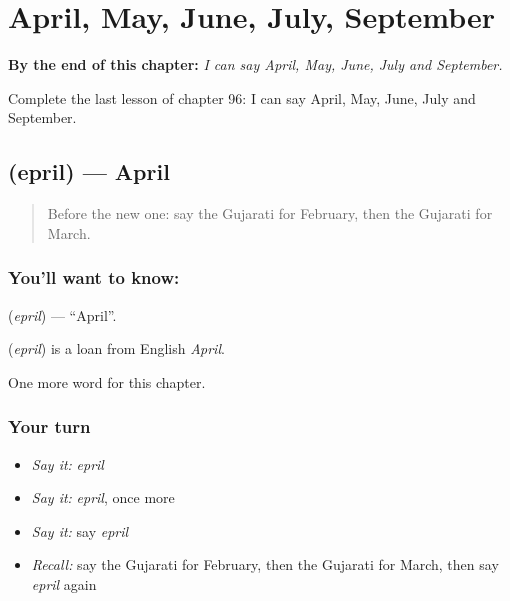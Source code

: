 
\chapter{April, May, June, July, September}
\label{ch:gu-april-may-june-july-september}

\begin{chapteropening}
\textbf{By the end of this chapter:} \emph{I can say April, May, June, July and September.}

Complete the last lesson of chapter 96: I can say April, May, June, July and September.
\end{chapteropening}

\section[\texorpdfstring{\gu{એપ્રિલ} (epril)}{એપ્રિલ (epril)}]{ (epril) — April}

\label{lesson:GU-C96-epril}



\begin{quote}
Before the new one: say the Gujarati for February, then the Gujarati for March.
\end{quote}

\subsection*{You'll want to know: }
\textbf{} (\emph{epril}) — \textquotedblleft{}April\textquotedblright{}.

\begin{cousinweb}
\textbf{} (\emph{epril}) is a loan from English \emph{April}.
\end{cousinweb}

\begin{grammarlens}[title={What you've built}]
One more word for this chapter.
\end{grammarlens}

\subsection*{Your turn}
\begin{itemize}
\raggedright
  \item \emph{Say it:} \emph{epril}
  \item \emph{Say it:} \emph{epril}, once more
  \item \emph{Say it:} say \emph{epril}
  \item \emph{Recall:} say the Gujarati for February, then the Gujarati for March, then say \emph{epril} again
\end{itemize}

